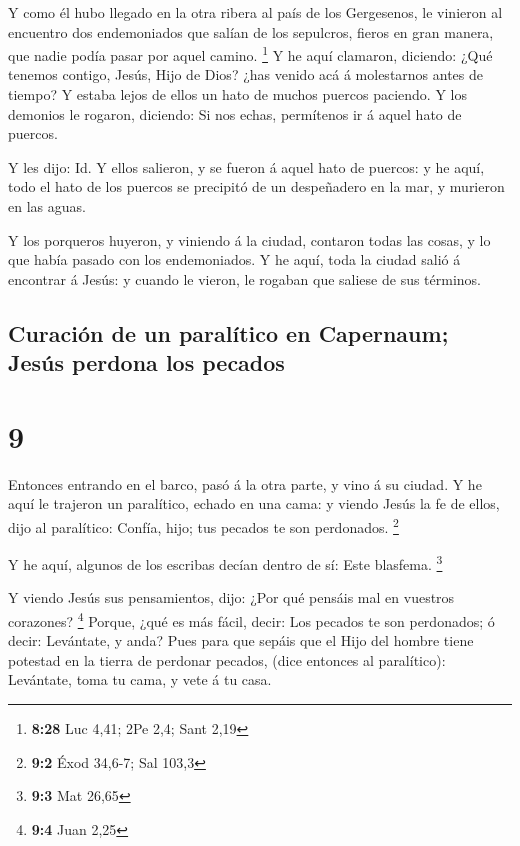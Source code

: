  Y como él hubo llegado en la otra ribera al país de los
Gergesenos, le vinieron al encuentro dos endemoniados que salían de los
sepulcros, fieros en gran manera, que nadie podía pasar por aquel
camino. \footnote{\textbf{8:28} Luc 4,41; 2Pe 2,4; Sant 2,19}
 Y he aquí clamaron, diciendo: ¿Qué tenemos contigo, Jesús,
Hijo de Dios? ¿has venido acá á molestarnos antes de tiempo?
 Y estaba lejos de ellos un hato de muchos puercos
paciendo.  Y los demonios le rogaron, diciendo: Si nos
echas, permítenos ir á aquel hato de puercos.

 Y les dijo: Id. Y ellos salieron, y se fueron á aquel hato
de puercos: y he aquí, todo el hato de los puercos se precipitó de un
despeñadero en la mar, y murieron en las aguas.

 Y los porqueros huyeron, y viniendo á la ciudad, contaron
todas las cosas, y lo que había pasado con los endemoniados.
 Y he aquí, toda la ciudad salió á encontrar á Jesús: y
cuando le vieron, le rogaban que saliese de sus términos.

\hypertarget{curaciuxf3n-de-un-paraluxedtico-en-capernaum-jesuxfas-perdona-los-pecados}{%
\subsection{Curación de un paralítico en Capernaum; Jesús perdona los
pecados}\label{curaciuxf3n-de-un-paraluxedtico-en-capernaum-jesuxfas-perdona-los-pecados}}

\hypertarget{section-8}{%
\section{9}\label{section-8}}

 Entonces entrando en el barco, pasó á la otra parte, y vino
á su ciudad.  Y he aquí le trajeron un paralítico, echado en
una cama: y viendo Jesús la fe de ellos, dijo al paralítico: Confía,
hijo; tus pecados te son perdonados. \footnote{\textbf{9:2} Éxod 34,6-7;
  Sal 103,3}

 Y he aquí, algunos de los escribas decían dentro de sí:
Este blasfema. \footnote{\textbf{9:3} Mat 26,65}

 Y viendo Jesús sus pensamientos, dijo: ¿Por qué pensáis mal
en vuestros corazones? \footnote{\textbf{9:4} Juan 2,25} 
Porque, ¿qué es más fácil, decir: Los pecados te son perdonados; ó
decir: Levántate, y anda?  Pues para que sepáis que el Hijo
del hombre tiene potestad en la tierra de perdonar pecados, (dice
entonces al paralítico): Levántate, toma tu cama, y vete á tu casa.

